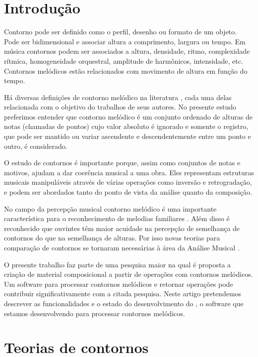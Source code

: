 \section{Introdução}
\label{sec:introducao}

Contorno pode ser definido como o perfil, desenho ou formato de um
objeto. Pode ser bidimensional e associar altura a comprimento,
largura ou tempo. Em música contornos podem ser associados a altura,
densidade, ritmo, complexidade rítmica, homogeneidade orquestral,
amplitude de harmônicos, intensidade, etc. Contornos melódicos estão
relacionados com movimento de altura em função do tempo.

Há diversas definições de contorno melódico na literatura
\cite{piston59:harmony,toch77:shaping,schonberg:fundamentals,adams76:melodic,marvin.ea87:relating,morris87:composition,clifford95:contour,beard03:contour},
cada uma delas relacionada com o objetivo do trabalhos de seus
autores. No presente estudo preferimos entender que contorno melódico
é um conjunto ordenado de alturas de notas (chamadas de pontos) cujo
valor absoluto é ignorado e somente o registro, que pode ser mantido
ou variar ascendente e descendentemente entre um ponto e outro, é
considerado.

O estudo de contornos é importante porque, assim como conjuntos de
notas e motivos, ajudam a dar coerência musical a uma obra. Eles
representam estruturas musicais manipuláveis através de várias
operações como inversão e retrogradação, e podem ser abordados tanto
do ponto de vista da análise quanto da composição.

No campo da percepção musical contorno melódico é uma importante
característica para o reconhecimento de melodias familiares \cite[p.
136]{dowling.ea86:music}. Além disso é reconhecido que ouvintes têm
maior acuidade na percepção de semelhança de contornos do que na
semelhança de alturas. Por isso novas teorias para comparação de
contornos se tornaram necessárias à área da Análise Musical
\cite[p. 226]{marvin.ea87:relating}.

O presente trabalho faz parte de uma pesquisa maior na qual é proposta
a criação de material composicional a partir de operações com
contornos melódicos. Um software para processar contornos melódicos e
retornar operações pode contribuir significativamente com a citada
pesquisa. Neste artigo pretendemos descrever as funcionalidades e o
estado do desenvolvimento do \goiaba, o software que estamos
desenvolvendo para processar contornos melódicos.

\section{Teorias de contornos}
\label{sec:teorias-de-contornos}

